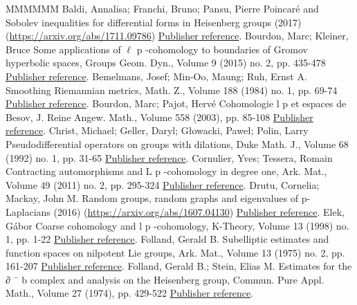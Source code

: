 \documentclass[11pt]{article}
\theoremstyle{definition}
\numberwithin{equation}{section}
\numberwithin{figure}{section}
\numberwithin{table}{section}
\begin{document}
\begin{thebibliography}{MMMMMM}
 Baldi, Annalisa; Franchi, Bruno; Pansu, Pierre Poincaré and Sobolev inequalities for differential forms in Heisenberg groups (2017) (\url{https://arxiv.org/abs/1711.09786}) \href{https://ahl.centre-mersenne.org/item/AHL_2018__1__267_0/#BFP}{Publisher reference}.
 Bourdon, Marc; Kleiner, Bruce Some applications of \(\ell\) p -cohomology to boundaries of Gromov hyperbolic spaces, Groups Geom. Dyn., Volume 9 (2015) no. 2, pp. 435-478 \href{https://ahl.centre-mersenne.org/item/AHL_2018__1__267_0/#Bourdon-Kleiner}{Publisher reference}.
 Bemelmans, Josef; Min-Oo, Maung; Ruh, Ernst A. Smoothing Riemannian metrics, Math. Z., Volume 188 (1984) no. 1, pp. 69-74 \href{https://ahl.centre-mersenne.org/item/AHL_2018__1__267_0/#B-MinOo-Ruh}{Publisher reference}.
 Bourdon, Marc; Pajot, Hervé Cohomologie l p  et espaces de Besov, J. Reine Angew. Math., Volume 558 (2003), pp. 85-108 \href{https://ahl.centre-mersenne.org/item/AHL_2018__1__267_0/#Bourdon-Pajot}{Publisher reference}.
 Christ, Michael; Geller, Daryl; Głowacki, Paweł; Polin, Larry Pseudodifferential operators on groups with dilations, Duke Math. J., Volume 68 (1992) no. 1, pp. 31-65 \href{https://ahl.centre-mersenne.org/item/AHL_2018__1__267_0/#CGGP}{Publisher reference}.
 Cornulier, Yves; Tessera, Romain Contracting automorphisms and L p -cohomology in degree one, Ark. Mat., Volume 49 (2011) no. 2, pp. 295-324 \href{https://ahl.centre-mersenne.org/item/AHL_2018__1__267_0/#Cornulier-Tessera}{Publisher reference}.
 Drutu, Cornelia; Mackay, John M. Random groups, random graphs and eigenvalues of p-Laplacians (2016) (\url{https://arxiv.org/abs/1607.04130}) \href{https://ahl.centre-mersenne.org/item/AHL_2018__1__267_0/#Drutu-Mackay}{Publisher reference}.
 Elek, Gábor Coarse cohomology and l p -cohomology, K-Theory, Volume 13 (1998) no. 1, pp. 1-22 \href{https://ahl.centre-mersenne.org/item/AHL_2018__1__267_0/#Elek}{Publisher reference}.
 Folland, Gerald B. Subelliptic estimates and function spaces on nilpotent Lie groups, Ark. Mat., Volume 13 (1975) no. 2, pp. 161-207 \href{https://ahl.centre-mersenne.org/item/AHL_2018__1__267_0/#Folland_1975}{Publisher reference}.
 Folland, Gerald B.; Stein, Elias M. Estimates for the ∂ ¯ b  complex and analysis on the Heisenberg group, Commun. Pure Appl. Math., Volume 27 (1974), pp. 429-522 \href{https://ahl.centre-mersenne.org/item/AHL_2018__1__267_0/#FollandStein}{Publisher reference}.

\end{thebibliography}
\end{document}

